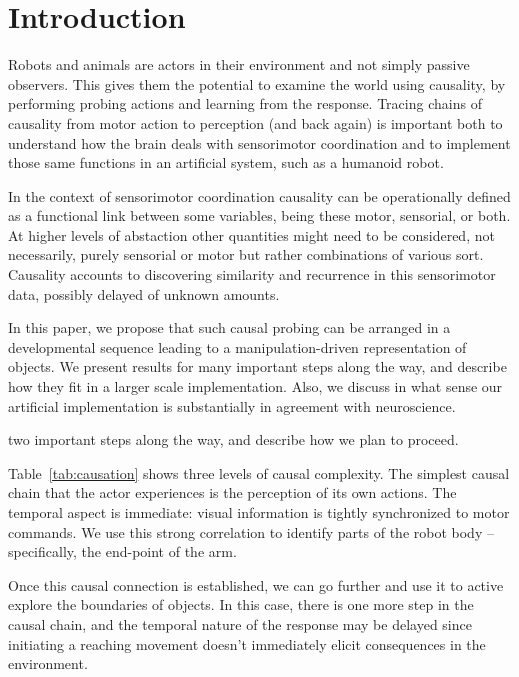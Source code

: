 

\section{Introduction}

Robots and animals are actors in their environment and not simply passive
observers.  This gives them the potential to examine the world using
causality, by performing probing actions and learning from the
response.  Tracing chains of causality from motor action to perception
(and back again) is important both to understand how the brain deals
with sensorimotor coordination and to implement those same functions
in an artificial system, such as a humanoid robot.

\ifverbose
In the context of sensorimotor coordination causality can be operationally
defined as a functional link between some variables, being these motor,
sensorial, or both.  At higher levels of abstaction other quantities might
need to be considered, not necessarily, purely sensorial or motor but
rather combinations of various sort. Causality accounts to discovering
similarity and recurrence in this sensorimotor data, possibly delayed of
unknown amounts.
\fi

In this paper, we propose that such causal probing can be arranged in
a developmental sequence leading to a manipulation-driven
representation of objects.  We present results for many important steps
along the way, and describe how they fit in a larger scale implementation.
Also, we discuss in what sense our artificial implementation is substantially 
in agreement with neuroscience. 

\ifverbose
two important
steps along the way, and describe how we plan to proceed.
\fi

Table~\ref{tab:causation} shows three levels of causal complexity.
The simplest causal chain that the actor experiences is the
perception of its own actions.  The temporal aspect is immediate:
visual information is tightly synchronized to motor commands.
\ifverbose
We use this strong correlation to identify parts of the robot
body -- specifically, the end-point of the arm. 
\fi

Once this causal connection is established, we can go further and use
it to active explore the boundaries of objects.  In this case, there
is one more step in the causal chain, and the temporal nature of
the response may be delayed since initiating a reaching movement doesn't
immediately elicit consequences in the environment.  

